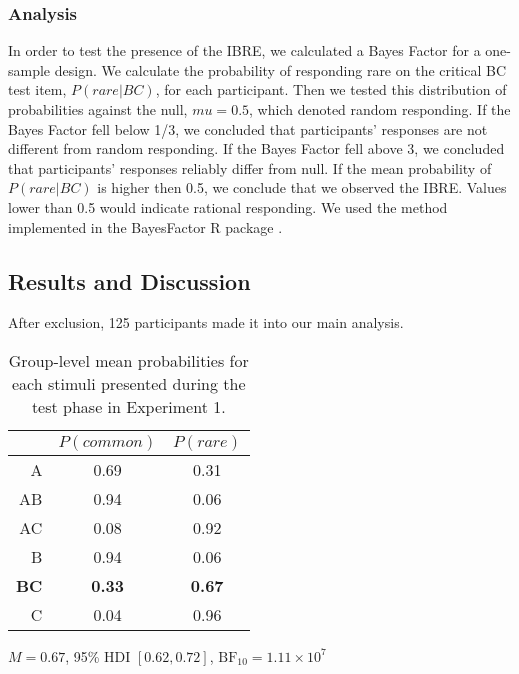 \documentclass[10pt,letterpaper]{article}
\begin{document}
\subsubsection*{Analysis}

In order to test the presence of the IBRE, we calculated a Bayes Factor for a one-sample design.
We calculate the probability of responding rare on the critical BC test item, $P(rare|BC)$, for each participant.
Then we tested this distribution of probabilities against the null, $mu = 0.5$, which denoted random responding.
If the Bayes Factor fell below 1/3, we concluded that participants' responses are not different from random responding.
If the Bayes Factor fell above 3, we concluded that participants' responses reliably differ from null.
If the mean probability of $P(rare|BC)$ is higher then 0.5, we conclude that we observed the IBRE.
Values lower than 0.5 would indicate rational responding.
We used the method implemented in the BayesFactor R package \cite{morey2022bayes}.

\subsection{Results and Discussion}

After exclusion, 125 participants made it into our main analysis.

\begin{table}[H]
  \begin{center}
    \caption{Group-level mean probabilities for each stimuli presented during the test phase in Experiment 1. \\}
    \label{tab:results-exp1}
    \vskip 0.12in
    \begin{tabular}{rcc}
      \hline
      & $P(common)$ & $P(rare)$ \\
      \hline
      A & 0.69 & 0.31 \\
      AB & 0.94 & 0.06 \\
      AC & 0.08 & 0.92 \\
      B & 0.94 & 0.06 \\
      \textbf{BC} & \textbf{0.33} & \textbf{0.67} \\
      C & 0.04 & 0.96 \\
    \end{tabular}
  \end{center}
\end{table}

$M = 0.67$, 95\% HDI $[0.62, 0.72]$, $\mathrm{BF}_{10} = 1.11 \times 10^{7}$
\end{document}
